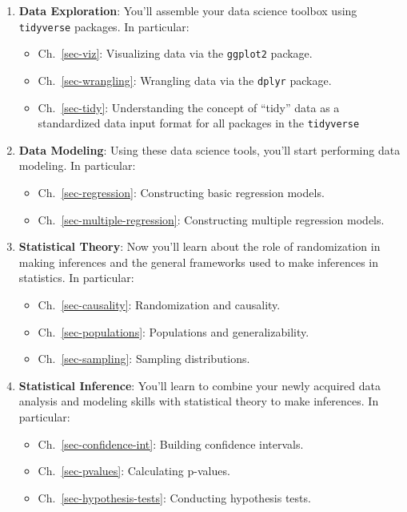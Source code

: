 \documentclass[
  letterpaper,
  DIV=11,
  numbers=noendperiod]{scrreprt}
\providecommand{\tightlist}{%
  \setlength{\itemsep}{0pt}\setlength{\parskip}{0pt}}\usepackage{longtable,booktabs,array}
\theoremstyle{definition}
\theoremstyle{remark}
\begin{document}
\begin{enumerate}
\def\labelenumi{\arabic{enumi}.}
\tightlist
\item
  \textbf{Data Exploration}: You'll assemble your data science toolbox
  using \texttt{tidyverse} packages. In particular:

  \begin{itemize}
  \tightlist
  \item
    Ch.~\ref{sec-viz}: Visualizing data via the \texttt{ggplot2}
    package.
  \item
    Ch.~\ref{sec-wrangling}: Wrangling data via the \texttt{dplyr}
    package.
  \item
    Ch.~\ref{sec-tidy}: Understanding the concept of ``tidy'' data as a
    standardized data input format for all packages in the
    \texttt{tidyverse}
  \end{itemize}
\item
  \textbf{Data Modeling}: Using these data science tools, you'll start
  performing data modeling. In particular:

  \begin{itemize}
  \tightlist
  \item
    Ch.~\ref{sec-regression}: Constructing basic regression models.
  \item
    Ch.~\ref{sec-multiple-regression}: Constructing multiple regression
    models.
  \end{itemize}
\item
  \textbf{Statistical Theory}: Now you'll learn about the role of
  randomization in making inferences and the general frameworks used to
  make inferences in statistics. In particular:

  \begin{itemize}
  \tightlist
  \item
    Ch.~\ref{sec-causality}: Randomization and causality.
  \item
    Ch.~\ref{sec-populations}: Populations and generalizability.
  \item
    Ch.~\ref{sec-sampling}: Sampling distributions.
  \end{itemize}
\item
  \textbf{Statistical Inference}: You'll learn to combine your newly
  acquired data analysis and modeling skills with statistical theory to
  make inferences. In particular:

  \begin{itemize}
  \tightlist
  \item
    Ch.~\ref{sec-confidence-int}: Building confidence intervals.
  \item
    Ch.~\ref{sec-pvalues}: Calculating p-values.
  \item
    Ch.~\ref{sec-hypothesis-tests}: Conducting hypothesis tests.
  \end{itemize}
\end{enumerate}
\end{document}

